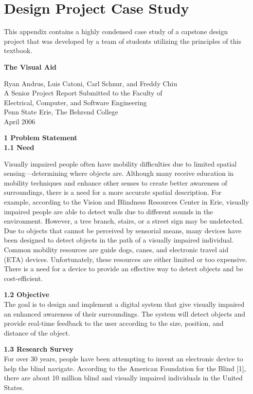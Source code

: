 \chapter{Design Project Case Study}
\label{chapter:appendixE}
\graphicspath{ {./appendixE/Fig} }

This appendix contains a highly condensed case study of a capstone
design project that was developed by a team of students utilizing the
principles of this textbook. 

\textbf{The Visual Aid}
\begin{center}
Ryan Andrus, Luis Catoni, Carl Schnur, and Freddy Chiu \\
A Senior Project Report Submitted to the Faculty of \\
Electrical, Computer, and Software Engineering \\
Penn State Erie, The Behrend College \\
April 2006
\end{center}

\textbf{1 Problem Statement}\\
\textbf{1.1 Need}


Visually impaired people often have mobility difficulties due to limited
spatial sensing---determining where objects are. Although many receive
education in mobility techniques and enhance other senses to create
better awareness of surroundings, there is a need for a more accurate
spatial description. For example, according to the Vision and Blindness
Resources Center in Erie, visually impaired people are able to detect
walls due to different sounds in the environment. However, a tree
branch, stairs, or a street sign may be undetected. Due to objects that
cannot be perceived by sensorial means, many devices have been designed
to detect objects in the path of a visually impaired individual. Common
mobility resources are guide dogs, canes, and electronic travel aid
(ETA) devices. Unfortunately, these resources are either limited or too
expensive. There is a need for a device to provide an effective way to
detect objects and be cost-efficient.


\textbf{1.2 Objective}\\
The goal is to design and implement a digital system that give visually
impaired an enhanced awareness of their surroundings. The system will
detect objects and provide real-time feedback to the user according to
the size, position, and distance of the object.

\textbf{1.3 Research Survey} \\
For over 30 years, people have been attempting to invent an electronic
device to help the blind navigate. According to the American Foundation
for the Blind {[}1{]}, there are about 10 million blind and visually
impaired individuals in the United States.

